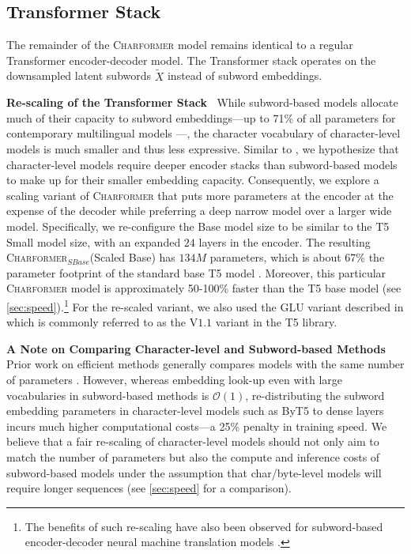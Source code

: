 \documentclass{article} \usepackage{iclr2022_conference,times}
\newcommand{\charformer}{\textsc{Charformer}\xspace}
\newcommand{\charformertall}{\textsc{Charformer}$_{SBase}$\xspace}
\begin{document}
\subsection{Transformer Stack} \label{sec:transformer-stack}

The remainder of the \charformer model remains identical to a regular Transformer encoder-decoder model. The Transformer stack operates on the downsampled latent subwords $\tilde{X}$ instead of subword embeddings. 

\noindent \textbf{Re-scaling of the Transformer Stack} $\:$ While subword-based models allocate much of their capacity to subword embeddings---up to 71\% of all parameters for contemporary multilingual models \citep{Chung2021rembert}---, the character vocabulary of character-level models is much smaller and thus less expressive. Similar to \citet{Xue2021byt5}, we hypothesize that character-level models require deeper encoder stacks than subword-based models to make up for their smaller embedding capacity. 
Consequently, we explore a scaling variant of \charformer that puts more parameters at the encoder at the expense of the decoder while preferring a deep narrow model over a larger wide model. Specifically, we re-configure the Base model size to be similar to the T5 Small model size, with an expanded $24$ layers in the encoder. The resulting \charformertall (Scaled Base) has $134M$ parameters, which is about 67\% the parameter footprint of the standard base T5 model \citep[200M parameters;][]{Raffel2020t5}. Moreover, this particular \charformer model is approximately 50-100\% faster than the T5 base model (see \textsection \ref{sec:speed}).\footnote{The benefits of such re-scaling have also been observed for subword-based encoder-decoder neural machine translation models \citep{devlin2017sharp,Kasai2021}.} For the re-scaled variant, we also used the GLU variant described in \citep{shazeer2020glu} which is commonly referred to as the V$1.1$ variant in the T5 library.



\noindent \textbf{A Note on Comparing Character-level and Subword-based Methods} $\:$ Prior work on efficient methods generally compares models with the same number of parameters \citep{Chung2021rembert}. However, whereas embedding look-up even with large vocabularies in subword-based methods is $\mathcal{O}(1)$, re-distributing the subword embedding parameters in character-level models such as ByT5 \citep{Xue2021byt5} to dense layers incurs much higher computational costs---a 25\% penalty in training speed.
We believe that a fair re-scaling of character-level models should not only aim to match the number of parameters but also the compute and inference costs of subword-based models under the assumption that char/byte-level models will require longer sequences (see \textsection \ref{sec:speed} for a comparison).
\end{document}
